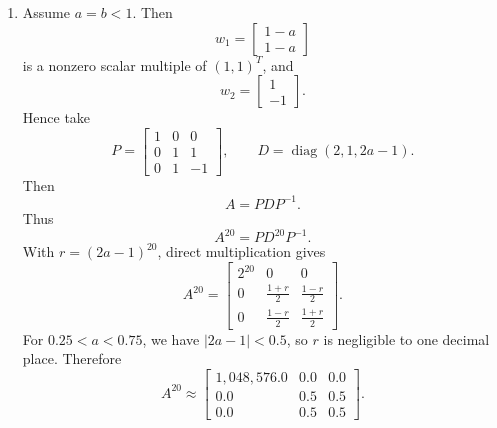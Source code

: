 \documentclass[12pt]{article}
\newcommand{\diag}{\operatorname{diag}}
\begin{document}
\begin{enumerate}[label=(\alph*)]
  If the two lower-block eigenvalues coincide, then $a+b=2$. Since $0<a\le1$ and $0<b\le1$, this forces $a=b=1$. Then $B=I_2$, and every vector in the lower two coordinates is an eigenvector with eigenvalue $1$. Hence the lower block is still diagonalizable. Therefore
  \[
  \boxed{A\text{ is diagonalizable}.}
  \]

  \item Assume $a=b<1$. Then
  \[
  w_1=\begin{bmatrix}1-a\\1-a\end{bmatrix}
  \]
  is a nonzero scalar multiple of $(1,1)^T$, and
  \[
  w_2=\begin{bmatrix}1\\-1\end{bmatrix}.
  \]
  Hence take
  \[
  P=\begin{bmatrix}1&0&0\\0&1&1\\0&1&-1\end{bmatrix},
  \qquad
  D=\diag(2,1,2a-1).
  \]
  Then
  \[
  A=PDP^{-1}.
  \]
  Thus
  \[
  A^{20}=PD^{20}P^{-1}.
  \]
  With $r=(2a-1)^{20}$, direct multiplication gives
  \[
  A^{20}=\begin{bmatrix}
  2^{20}&0&0\\
  0&\frac{1+r}{2}&\frac{1-r}{2}\\
  0&\frac{1-r}{2}&\frac{1+r}{2}
  \end{bmatrix}.
  \]
  For $0.25<a<0.75$, we have $|2a-1|<0.5$, so $r$ is negligible to one decimal place. Therefore
  \[
  \boxed{
  A^{20}\approx
  \begin{bmatrix}
  1{,}048{,}576.0&0.0&0.0\\
  0.0&0.5&0.5\\
  0.0&0.5&0.5
  \end{bmatrix}.}
  \]
\end{enumerate}

\newpage
\end{document}
